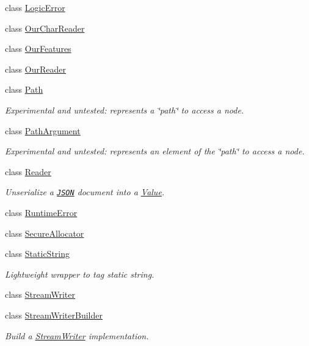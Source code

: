 \begin{DoxyCompactItemize}
class \hyperlink{class_json_1_1_logic_error}{Logic\+Error}
\item 
class \hyperlink{class_json_1_1_our_char_reader}{Our\+Char\+Reader}
\item 
class \hyperlink{class_json_1_1_our_features}{Our\+Features}
\item 
class \hyperlink{class_json_1_1_our_reader}{Our\+Reader}
\item 
class \hyperlink{class_json_1_1_path}{Path}
\begin{DoxyCompactList}\small\item\em Experimental and untested\+: represents a \char`\"{}path\char`\"{} to access a node. \end{DoxyCompactList}\item 
class \hyperlink{class_json_1_1_path_argument}{Path\+Argument}
\begin{DoxyCompactList}\small\item\em Experimental and untested\+: represents an element of the \char`\"{}path\char`\"{} to access a node. \end{DoxyCompactList}\item 
class \hyperlink{class_json_1_1_reader}{Reader}
\begin{DoxyCompactList}\small\item\em Unserialize a \href{http://www.json.org}{\tt J\+S\+ON} document into a \hyperlink{class_json_1_1_value}{Value}. \end{DoxyCompactList}\item 
class \hyperlink{class_json_1_1_runtime_error}{Runtime\+Error}
\item 
class \hyperlink{class_json_1_1_secure_allocator}{Secure\+Allocator}
\item 
class \hyperlink{class_json_1_1_static_string}{Static\+String}
\begin{DoxyCompactList}\small\item\em Lightweight wrapper to tag static string. \end{DoxyCompactList}\item 
class \hyperlink{class_json_1_1_stream_writer}{Stream\+Writer}
\item 
class \hyperlink{class_json_1_1_stream_writer_builder}{Stream\+Writer\+Builder}
\begin{DoxyCompactList}\small\item\em Build a \hyperlink{class_json_1_1_stream_writer}{Stream\+Writer} implementation. \end{DoxyCompactList}\item 

\end{DoxyCompactItemize}
